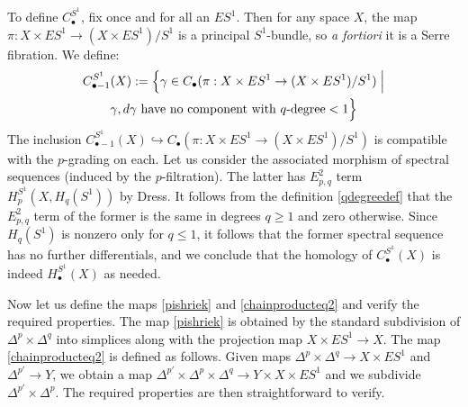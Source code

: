 \documentclass[12pt]{article}
\theoremstyle{definition}
\theoremstyle{remark}
\numberwithin{equation}{subsection}
\begin{document}
To define $C_\bullet^{S^1}$, fix once and for all an $ES^1$.  Then for any space $X$, the map $\pi:X\times ES^1\to(X\times ES^1)/S^1$ is a principal $S^1$-bundle, so \emph{a fortiori} it is a Serre fibration.  We define:
\begin{multline}\label{qdegreedef}
C_{\bullet-1}^{S^1}(X):=\Bigl\{\gamma\in C_\bullet(\pi:X\times ES^1\to(X\times ES^1)/S^1)\Bigm|\\
\gamma,d\gamma\text{ have no component with $q$-degree}<1\Bigr\}
\end{multline}
The inclusion $C_{\bullet-1}^{S^1}(X)\hookrightarrow C_\bullet(\pi:X\times ES^1\to(X\times ES^1)/S^1)$ is compatible with the $p$-grading on each.  Let us consider the associated morphism of spectral sequences (induced by the $p$-filtration).  The latter has $E^2_{p,q}$ term $H_p^{S^1}(X,H_q(S^1))$ by Dress.  It follows from the definition \eqref{qdegreedef} that the $E^2_{p,q}$ term of the former is the same in degrees $q\geq 1$ and zero otherwise.  Since $H_q(S^1)$ is nonzero only for $q\leq 1$, it follows that the former spectral sequence has no further differentials, and we conclude that the homology of $C_\bullet^{S^1}(X)$ is indeed $H_\bullet^{S^1}(X)$ as needed.

Now let us define the maps \eqref{pishriek} and \eqref{chainproducteq2} and verify the required properties.  The map \eqref{pishriek} is obtained by the standard subdivision of $\Delta^p\times\Delta^q$ into simplices along with the projection map $X\times ES^1\to X$.  The map \eqref{chainproducteq2} is defined as follows.  Given maps $\Delta^p\times\Delta^q\to X\times ES^1$ and $\Delta^{p'}\to Y$, we obtain a map $\Delta^{p'}\times\Delta^p\times\Delta^q\to Y\times X\times ES^1$ and we subdivide $\Delta^{p'}\times\Delta^p$.  The required properties are then straightforward to verify.
\end{document}
